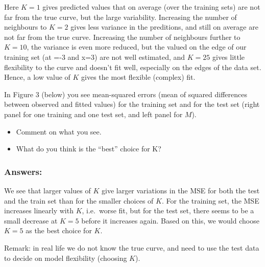 \documentclass[]{article}
\providecommand{\tightlist}{%
  \setlength{\itemsep}{0pt}\setlength{\parskip}{0pt}}
\begin{document}
{Here \(K=1\) gives predicted values that on average (over the training
sets) are not far from the true curve, but the large variability.
Increasing the number of neighbours to \(K=2\) gives less variance in
the preditions, and still on average are not far from the true curve.
Increasing the number of neighbours further to \(K=10\), the variance is
even more reduced, but the valued on the edge of our training set (at
=-3 and x=3) are not well estimated, and \(K=25\) gives little
flexibility to the curve and doesn't fit well, especially on the edges
of the data set. Hence, a low value of \(K\) gives the most flexible
(complex) fit.}

In Figure 3 (below) you see mean-squared errors (mean of squared
differences between observed and fitted values) for the training set and
for the test set (right panel for one training and one test set, and
left panel for \(M\)).

\begin{itemize}
\tightlist
\item
  Comment on what you see.
\item
  What do you think is the ``best'' choice for K?
\end{itemize}

\subsubsection{Answers:}\label{answers-1}

{ We see that larger values of \(K\) give larger variations in the MSE
for both the test and the train set than for the smaller choices of
\(K\). For the training set, the MSE increases linearly with \(K\),
i.e.~worse fit, but for the test set, there seems to be a small decrease
at \(K=5\) before it increases again. Based on this, we would choose
\(K=5\) as the best choice for \(K\). }

Remark: in real life we do not know the true curve, and need to use the
test data to decide on model flexibility (choosing \(K\)).
\end{document}
